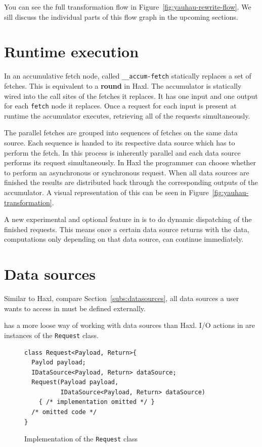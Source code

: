 You can see the full \yauhau{} transformation flow in Figure~\ref{fig:yauhau-rewrite-flow}.
We sill discuss the individual parts of this flow graph in the upcoming sections.

\section{Runtime execution}

In \yauhau{} an accumulative fetch node, called \texttt{\_\_accum-fetch} statically replaces a set of fetches.
This is equivalent to a \textbf{round} in Haxl.
The accumulator is statically wired into the call sites of the fetches it replaces.
It has one input and one output for each \texttt{fetch} node it replaces.
Once a request for each input is present at runtime the accumulator executes, retrieving all of the requests simultaneously.

The parallel fetches are grouped into sequences of fetches on the same data source.
Each sequence is handed to its respective data source which has to perform the fetch.
In \yauhau{} this process is inherently parallel and each data source performs its request simultaneously.
In Haxl the programmer can choose whether to perform an asynchronous or synchronous request.
When all data sources are finished the results are distributed back through the corresponding outputs of the accumulator.
A visual representation of this can be seen in Figure~\ref{fig:yauhau-transformation}.

A new experimental and optional feature in \yauhau{} is to do dynamic dispatching of the finished requests.
This means once a certain data source returns with the data, computations only depending on that data source, can continue immediately.

\section{Data sources}

Similar to Haxl, compare Section~\ref{subs:datasources}, all data sources a user wants to access in \yauhau{} must be defined externally.

\yauhau{} has a more loose way of working with data sources than Haxl.
I/O actions in \yauhau{} are instances of the \texttt{Request} class.

\begin{figure}[h]
\begin{verbatim}
class Request<Payload, Return>{
  Paylod payload;
  IDataSource<Payload, Return> dataSource;
  Request(Payload payload,
          IDataSource<Payload, Return> dataSource)
    { /* implementation omitted */ }
  /* omitted code */
}
\end{verbatim}
\caption{Implementation of the \texttt{Request} class}
\label{fig:request-class-implementation}
\end{figure}

